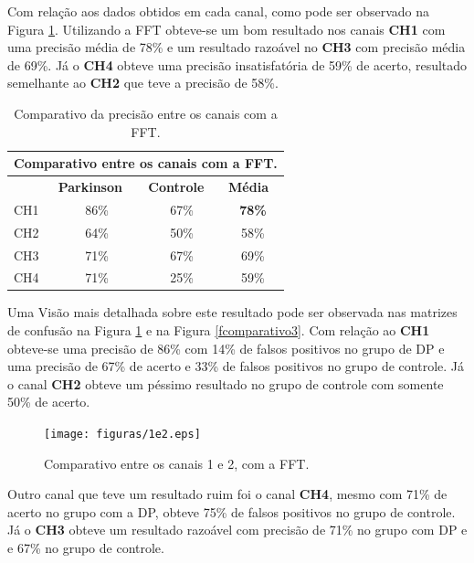 Com relação aos dados obtidos em cada canal, como pode ser observado na Figura \ref{fcomparativo1}. Utilizando a FFT obteve-se um bom resultado nos canais \textbf{CH1} com uma precisão média de 78\% e um resultado razoável no \textbf{CH3} com precisão média de 69\%. Já o \textbf{CH4} obteve uma precisão insatisfatória de  59\% de acerto, resultado semelhante ao \textbf{CH2} que teve a precisão de 58\%.


\begin{table}[]
\centering
\begin{tabular}{lccc}
\hline
\multicolumn{4}{c}{Comparativo entre os canais com a FFT.}                                                                \\ \hline
    & \multicolumn{1}{l}{\textbf{Parkinson}} & \multicolumn{1}{l}{\textbf{Controle}} & \multicolumn{1}{l}{\textbf{Média}} \\
CH1 & 86\%                                   & 67\%                                  & \textbf{78\%}                      \\
CH2 & 64\%                                   & 50\%                                  & 58\%                               \\
CH3 & 71\%                                   & 67\%                                  & 69\%                               \\
CH4 & 71\%                                   & 25\%                                  & 59\%                               \\ \hline
\end{tabular}
\caption{Comparativo da precisão entre os canais com a FFT.}
\label{fcomparativo1}
\end{table}


Uma Visão mais detalhada sobre este resultado pode ser observada nas matrizes de confusão na Figura \ref{fcomparativo2} e na Figura \ref{fcomparativo3}. Com relação ao \textbf{CH1} obteve-se uma precisão de 86\% com 14\% de falsos positivos no grupo de DP e uma precisão de 67\% de acerto e 33\% de falsos positivos no grupo de controle. Já o canal \textbf{CH2} obteve um péssimo resultado no grupo de controle com somente 50\% de acerto. 

\begin{figure}[!t]
    \centering
    \texttt{[image: figuras/1e2.eps]}
    \caption{Comparativo entre os canais 1 e 2, com a FFT.}
    \label{fcomparativo2}
\end{figure}

Outro canal que teve um resultado ruim foi o canal \textbf{CH4}, mesmo com 71\% de acerto no grupo com a DP, obteve 75\% de falsos positivos no grupo de controle. Já o \textbf{CH3} obteve um resultado razoável com precisão de 71\% no grupo com DP e e 67\% no grupo de controle.

